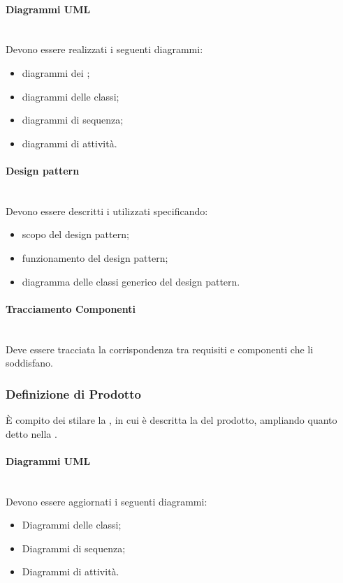 \paragraph{Diagrammi UML}\mbox{}\\
Devono essere realizzati i seguenti diagrammi:
\begin{itemize}
\item diagrammi dei ;
\item diagrammi delle classi;
\item diagrammi di sequenza;
\item diagrammi di attività.
\end{itemize}

\paragraph{Design pattern}\mbox{}\\
Devono essere descritti i  utilizzati specificando:
\begin{itemize}
	\item scopo del design pattern;
	\item funzionamento del design pattern;
	\item diagramma delle classi generico del design pattern.
\end{itemize}

\paragraph{Tracciamento Componenti}\mbox{}\\
Deve essere tracciata la corrispondenza tra requisiti e componenti che li soddisfano.

\subsubsection{Definizione di Prodotto}
\`{E} compito dei \Progettisti{} stilare la \DefinizioneDiProdotto, in cui è descritta la \PD{} del prodotto, ampliando quanto detto nella \SpecificaTecnica.

\paragraph{Diagrammi UML}\mbox{}\\
Devono essere aggiornati i seguenti diagrammi:
\begin{itemize}
\item Diagrammi delle classi;
\item Diagrammi di sequenza;
\item Diagrammi di attività.
\end{itemize}

